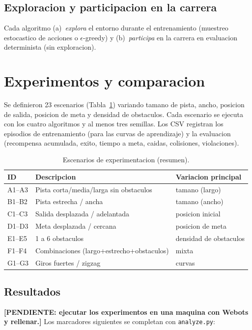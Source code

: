 \documentclass[conference]{IEEEtran}
\begin{document}
\subsection{Exploracion y participacion en la carrera}
Cada algoritmo (a)~\emph{explora} el entorno durante el entrenamiento (muestreo
estocastico de acciones o $\epsilon$-greedy) y (b)~\emph{participa} en la carrera
en evaluacion determinista (sin exploracion).

\section{Experimentos y comparacion}
Se definieron 23 escenarios (Tabla~\ref{tab:exps}) variando tamano de pista,
ancho, posicion de salida, posicion de meta y densidad de obstaculos. Cada
escenario se ejecuta con los cuatro algoritmos y al menos tres semillas. Los CSV
registran los episodios de entrenamiento (para las curvas de aprendizaje) y la
evaluacion (recompensa acumulada, exito, tiempo a meta, caidas, colisiones,
violaciones).

\begin{table}[t]
\caption{Escenarios de experimentacion (resumen).}
\label{tab:exps}
\centering
\scriptsize
\begin{tabular}{@{}lll@{}}
\toprule
ID & Descripcion & Variacion principal \\
\midrule
A1--A3 & Pista corta/media/larga sin obstaculos & tamano (largo) \\
B1--B2 & Pista estrecha / ancha & tamano (ancho) \\
C1--C3 & Salida desplazada / adelantada & posicion inicial \\
D1--D3 & Meta desplazada / cercana & posicion de meta \\
E1--E5 & 1 a 6 obstaculos & densidad de obstaculos \\
F1--F4 & Combinaciones (largo+estrecho+obstaculos) & mixta \\
G1--G3 & Giros fuertes / zigzag & curvas \\
\bottomrule
\end{tabular}
\end{table}

\subsection{Resultados}
\textbf{[PENDIENTE: ejecutar los experimentos en una maquina con Webots y
rellenar.]} Los marcadores siguientes se completan con \texttt{analyze.py}:
\end{document}
